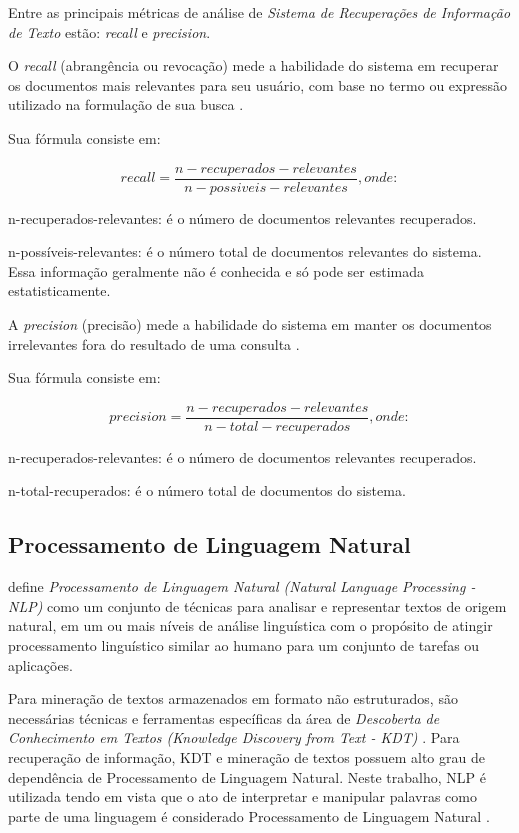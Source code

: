 Entre as principais métricas de análise de \textit{Sistema de Recuperações de Informação de Texto} estão: \textit{recall} e \textit{precision}.

O \textit{recall} (abrangência ou revocação) mede a habilidade do sistema em recuperar os documentos mais relevantes para seu usuário, com base no termo ou expressão utilizado na formulação de sua busca \cite{morais2007mineraccao}.

Sua fórmula consiste em:

\begin{equation}
\label{eq:recall-description-morais}
 {recall} = \frac{{n-recuperados-relevantes}}{{n-possiveis-relevantes}}, onde:
\end{equation}

n-recuperados-relevantes: é o número de documentos relevantes recuperados.

n-possíveis-relevantes: é o número total de documentos relevantes do sistema. Essa informação
geralmente não é conhecida e só pode ser estimada estatisticamente.

A \textit{precision} (precisão) mede a habilidade do sistema em manter os documentos irrelevantes fora do resultado de uma consulta \cite{morais2007mineraccao}.

Sua fórmula consiste em:

\begin{equation}
\label{eq:precision-description-morais}
 {precision} = \frac{{n-recuperados-relevantes}}{{n-total-recuperados}}, onde:
\end{equation}

n-recuperados-relevantes: é o número de documentos relevantes recuperados.

n-total-recuperados: é o número total de documentos do sistema.


\subsection{Processamento de Linguagem Natural}
\cite{liddy2001naturallanguage} define \textit{Processamento de Linguagem Natural (Natural Language Processing - NLP)} como um conjunto de técnicas para analisar e representar textos de origem natural, em um ou mais níveis de análise linguística com o propósito de atingir processamento linguístico similar ao humano para um conjunto de tarefas ou aplicações. 

Para mineração de textos armazenados em formato não estruturados, são necessárias técnicas e ferramentas específicas da área de \textit{Descoberta de Conhecimento em Textos (Knowledge Discovery from Text - KDT)} \cite{morais2007mineraccao}. Para recuperação de informação, KDT e mineração de textos possuem alto grau de dependência de Processamento de Linguagem Natural.
Neste trabalho, NLP é utilizada tendo em vista que o ato de interpretar e manipular palavras como parte de uma linguagem é considerado Processamento de Linguagem Natural \cite{morais2007mineraccao}.


